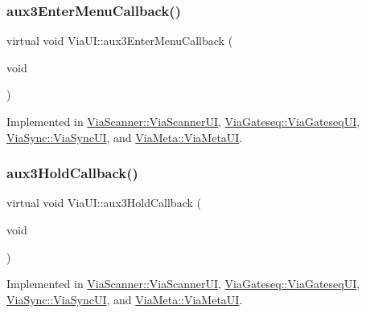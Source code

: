 \mbox{\label{class_via_u_i_aa62c9f8dc58d37fc2a3abc7bce1cd16e}} 
\subsubsection{\texorpdfstring{aux3\+Enter\+Menu\+Callback()}{aux3EnterMenuCallback()}}
{\footnotesize\ttfamily virtual void Via\+U\+I\+::aux3\+Enter\+Menu\+Callback (\begin{DoxyParamCaption}\item[{void}]{ }\end{DoxyParamCaption})\hspace{0.3cm}{\ttfamily [pure virtual]}}



Implemented in \mbox{\hyperlink{class_via_scanner_1_1_via_scanner_u_i_ade6dc0e93911fe51731bffa65990599a}{Via\+Scanner\+::\+Via\+Scanner\+UI}}, \mbox{\hyperlink{class_via_gateseq_1_1_via_gateseq_u_i_a8235806bb28a40062b89b1cb9c83e3b0}{Via\+Gateseq\+::\+Via\+Gateseq\+UI}}, \mbox{\hyperlink{class_via_sync_1_1_via_sync_u_i_a66f7a9ccbfff3b1b1ba32fe775808703}{Via\+Sync\+::\+Via\+Sync\+UI}}, and \mbox{\hyperlink{class_via_meta_1_1_via_meta_u_i_a31f9a7e08ee2d77d7aa96b644369e92d}{Via\+Meta\+::\+Via\+Meta\+UI}}.

\mbox{\label{class_via_u_i_a9ea505dfd800b261beabe8dc47b201d3}} 
\subsubsection{\texorpdfstring{aux3\+Hold\+Callback()}{aux3HoldCallback()}}
{\footnotesize\ttfamily virtual void Via\+U\+I\+::aux3\+Hold\+Callback (\begin{DoxyParamCaption}\item[{void}]{ }\end{DoxyParamCaption})\hspace{0.3cm}{\ttfamily [pure virtual]}}



Implemented in \mbox{\hyperlink{class_via_scanner_1_1_via_scanner_u_i_ac79b09eb94d39065b6b5061d34746862}{Via\+Scanner\+::\+Via\+Scanner\+UI}}, \mbox{\hyperlink{class_via_gateseq_1_1_via_gateseq_u_i_a5b18aa40706a39ed8878143d6911bc78}{Via\+Gateseq\+::\+Via\+Gateseq\+UI}}, \mbox{\hyperlink{class_via_sync_1_1_via_sync_u_i_ae35a16d1e3a6158ffd306b06e93b16a4}{Via\+Sync\+::\+Via\+Sync\+UI}}, and \mbox{\hyperlink{class_via_meta_1_1_via_meta_u_i_ad15168253fc76c7a938ca467ada12ade}{Via\+Meta\+::\+Via\+Meta\+UI}}.

